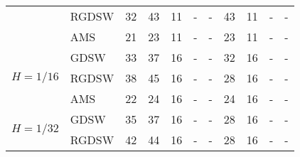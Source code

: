 \begin{table}[H]
\begin{tabular}{llrrrllrrll}
\cline{2-11}
\bfseries  & RGDSW & 32 & {\cellcolor[HTML]{405FE5}} \color[HTML]{F1F1F1} 43 & 11 & {\cellcolor[HTML]{ACB8F4}} \color[HTML]{000000} {\cellcolor[HTML]{E2E4FB}} - & - & {\cellcolor[HTML]{768BEC}} \color[HTML]{F1F1F1} 43 & 11 & {\cellcolor[HTML]{E2E4FB}} \color[HTML]{000000} {\cellcolor[HTML]{E2E4FB}} - & - \\
\cline{2-11}
\bfseries  & AMS & 21 & {\cellcolor[HTML]{405FE5}} \color[HTML]{F1F1F1} 23 & 11 & {\cellcolor[HTML]{ACB8F4}} \color[HTML]{000000} {\cellcolor[HTML]{E2E4FB}} - & - & {\cellcolor[HTML]{768BEC}} \color[HTML]{F1F1F1} 23 & 11 & {\cellcolor[HTML]{E2E4FB}} \color[HTML]{000000} {\cellcolor[HTML]{E2E4FB}} - & - \\
\cline{1-11} \cline{2-11}
\multirow[c]{3}{*}{\bfseries $H=1/16$} & GDSW & 33 & {\cellcolor[HTML]{768BEC}} \color[HTML]{F1F1F1} 37 & 16 & {\cellcolor[HTML]{ACB8F4}} \color[HTML]{000000} {\cellcolor[HTML]{E2E4FB}} - & - & {\cellcolor[HTML]{405FE5}} \color[HTML]{F1F1F1} 32 & 16 & {\cellcolor[HTML]{E2E4FB}} \color[HTML]{000000} {\cellcolor[HTML]{E2E4FB}} - & - \\
\cline{2-11}
\bfseries  & RGDSW & 38 & {\cellcolor[HTML]{405FE5}} \color[HTML]{F1F1F1} 45 & 16 & {\cellcolor[HTML]{ACB8F4}} \color[HTML]{000000} {\cellcolor[HTML]{E2E4FB}} - & - & {\cellcolor[HTML]{768BEC}} \color[HTML]{F1F1F1} 28 & 16 & {\cellcolor[HTML]{E2E4FB}} \color[HTML]{000000} {\cellcolor[HTML]{E2E4FB}} - & - \\
\cline{2-11}
\bfseries  & AMS & 22 & {\cellcolor[HTML]{405FE5}} \color[HTML]{F1F1F1} 24 & 16 & {\cellcolor[HTML]{ACB8F4}} \color[HTML]{000000} {\cellcolor[HTML]{E2E4FB}} - & - & {\cellcolor[HTML]{768BEC}} \color[HTML]{F1F1F1} 24 & 16 & {\cellcolor[HTML]{E2E4FB}} \color[HTML]{000000} {\cellcolor[HTML]{E2E4FB}} - & - \\
\cline{1-11} \cline{2-11}
\multirow[c]{3}{*}{\bfseries $H=1/32$} & GDSW & 35 & {\cellcolor[HTML]{405FE5}} \color[HTML]{F1F1F1} 37 & 16 & {\cellcolor[HTML]{ACB8F4}} \color[HTML]{000000} {\cellcolor[HTML]{E2E4FB}} - & - & {\cellcolor[HTML]{768BEC}} \color[HTML]{F1F1F1} 28 & 16 & {\cellcolor[HTML]{E2E4FB}} \color[HTML]{000000} {\cellcolor[HTML]{E2E4FB}} - & - \\
\cline{2-11}
\bfseries  & RGDSW & 42 & {\cellcolor[HTML]{405FE5}} \color[HTML]{F1F1F1} 44 & 16 & {\cellcolor[HTML]{ACB8F4}} \color[HTML]{000000} {\cellcolor[HTML]{E2E4FB}} - & - & {\cellcolor[HTML]{768BEC}} \color[HTML]{F1F1F1} 28 & 16 & {\cellcolor[HTML]{E2E4FB}} \color[HTML]{000000} {\cellcolor[HTML]{E2E4FB}} - & - \\

\end{tabular}
\end{table}
